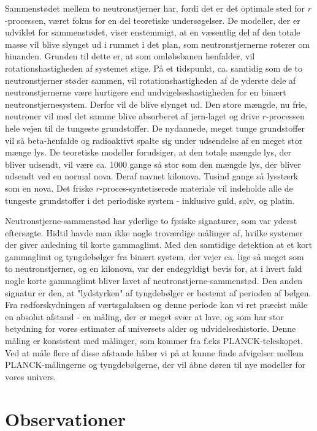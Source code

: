 \documentclass[twocolumn]{article}
\begin{document}
Sammenstødet mellem to neutronstjerner har, fordi det er det optimale sted for $r$-processen, været fokus for en del teoretiske undersøgelser. De modeller, der er udviklet for sammenstødet, viser enstemmigt, at en væsentlig del af den totale masse vil blive slynget ud i rummet i det plan, som neutronstjernerne roterer om hinanden. Grunden til dette er, at som omløbsbanen henfalder, vil rotationshastigheden af systemet stige. På et tidspunkt, ca. samtidig som de to neutronstjerner støder sammen, vil rotationshastigheden af de yderste dele af neutronstjernerne være hurtigere end undvigelseshastigheden for en binært neutronstjernesystem. Derfor vil de blive slynget ud. Den store mængde, nu frie, neutroner vil med det samme blive absorberet af jern-laget og drive $r$-processen hele vejen til de tungeste grundstoffer. De nydannede, meget tunge grundstoffer vil så beta-henfalde og radioaktivt spalte sig under udsendelse af en meget stor mænge lys. De teoretiske modeller forudsiger, at den totale mængde lys, der bliver udsendt, vil være ca. 1000 gange så stor som den mængde lys, der bliver udsendt ved en normal nova. Deraf navnet kilonova. Tusind gange så lysstærk som en nova. Det friske $r$-proces-syntetiserede materiale vil indeholde alle de tungeste grundstoffer i det periodiske system - inklusive guld, sølv, og platin.

Neutronstjerne-sammenstød har yderlige to fysiske signaturer, som var yderst eftersøgte. Hidtil havde man ikke nogle troværdige målinger af, hvilke systemer der giver anledning til korte gammaglimt. Med den samtidige detektion at et kort gammaglimt og tyngdebølger fra binært system, der vejer ca. lige så meget som to neutronstjerner, og en kilonova, var der endegyldigt bevis for, at i hvert fald nogle korte gammaglimt bliver lavet af neutronstjerne-sammenstød. Den anden signatur er den, at "lydstyrken" af tyngdebølger er bestemt af perioden af bølgen. Fra rødforskydningen af værtsgalaksen og denne periode kan vi ret præcist måle en absolut afstand - en måling, der er meget svær at lave, og som har stor betydning for vores estimater af universets alder og udvidelseshistorie. Denne måling er konsistent med målinger, som kommer fra f.eks PLANCK-teleskopet. Ved at måle flere af disse afstande håber vi på at kunne finde afvigelser mellem PLANCK-målingerne og tyngdebølgerne, der vil åbne døren til nye modeller for vores univers. 


\section{Observationer}\label{obs}
\end{document}

